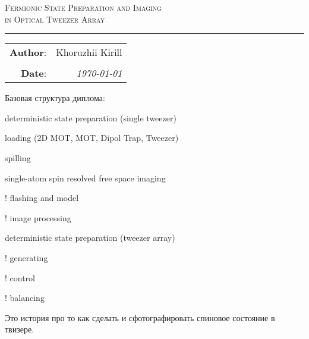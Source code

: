 
\begin{center}
    \LARGE \textsc{Fermionic State Preparation and Imaging \\ in Optical Tweezer Array}
\end{center}

\hrule

\phantom{42}

\begin{flushright}
    \begin{tabular}{rr}
        \textbf{Author}: 
        & Khoruzhii Kirill \\
        & \\
        \textbf{Date}: &
        \textit{\today}\\
    \end{tabular}
\end{flushright}

\thispagestyle{empty}

\tableofcontents

\vfill

Базовая структура диплома:
\begin{enumerate*}
    \item deterministic state preparation (single tweezer)
    \begin{enumerate*}
        \item loading (2D MOT, MOT, Dipol Trap, Tweezer)
        \item spilling
    \end{enumerate*}
    \item single-atom spin resolved free space imaging
    \begin{enumerate*}
        \item ! flashing and model
        \item ! image processing
    \end{enumerate*}
    \item deterministic state preparation (tweezer array)
    \begin{enumerate*}
        \item ! generating
        \item ! control
        \item ! balancing
    \end{enumerate*}
\end{enumerate*}

Это история про то как сделать и сфотографировать спиновое состояние в твизере.     


\newpage

